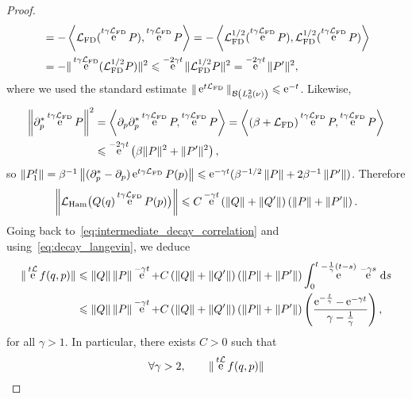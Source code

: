 \documentclass[11pt,a4paper]{article}
\DeclareMathOperator{\e}{e}
\renewcommand{\d}{\mathrm d}
\theoremstyle{plain}
\numberwithin{equation}{section}
\renewcommand{\leq}{\leqslant}
\begin{document}
\begin{proof}
\begin{align*}
        &= - \ip{\mathcal L_{\rm FD} (\e^{t \gamma \mathcal L_{\rm FD}} P)}{\e^{t \gamma \mathcal L_{\rm FD}} P}
        = - \ip{\mathcal L_{\rm FD}^{1/2} (\e^{t \gamma \mathcal L_{\rm FD}} P)}{\mathcal L_{\rm FD}^{1/2} (\e^{t \gamma \mathcal L_{\rm FD}} P)} \\
        &= - \norm*{\e^{t \gamma \mathcal L_{\rm FD}} (\mathcal L_{\rm FD}^{1/2}P)}^2 \leq \e^{-2\gamma t} \norm*{\mathcal L_{\rm FD}^{1/2} P}^2
        = \e^{-2\gamma t} \norm*{P'}^2,
    \end{align*}
    where we used the standard estimate $\norm*{\e^{t \mathcal L_{\rm FD}}}[\mathcal B \left( L^2_0(\nu) \right)] \leq \e^{- t}$.
    Likewise,
    \begin{align*}
        \norm{\partial_p^* \e^{t \gamma \mathcal L_{\rm FD}} P}^2
        &= \ip{\partial_p \partial_p^*\e^{t \gamma \mathcal L_{\rm FD}} P}{\e^{t \gamma \mathcal L_{\rm FD}} P}
        = \ip{(\beta  +\mathcal L_{\rm FD}) \e^{t \gamma \mathcal L_{\rm FD}} P}{\e^{t \gamma \mathcal L_{\rm FD}} P} \\
        &\leq \e^{-2\gamma t} \left( \beta \norm*{P}^2 + \norm*{P'}^2 \right),
    \end{align*}
    so $\norm{P^t_1} = \beta^{-1} \norm{ (\partial_p^* - \partial_p) \e^{t \gamma \mathcal L_{\rm FD}} P(p)} \leq \e^{- \gamma t} (\beta^{-1/2}\norm{P} +  2\beta^{-1}\norm{P'})$.
    Therefore
    \[
        \norm{\mathcal L_{\rm Ham} \bigl(Q(q) \e^{t \gamma \mathcal L_{\rm FD}} P(p)\bigr)}
        \leq C \e^{-\gamma t} \left( \norm*{Q} +  \norm*{Q'}\right) \left( \norm*{P} + \norm*{P'} \right).
    \]
    Going back to~\eqref{eq:intermediate_decay_correlation} and using~\eqref{eq:decay_langevin}, we deduce
    \begin{align*}
        \norm*{ \e^{t \mathcal L} f(q,p) }
        &\leq \norm{Q} \norm{P} \e^{-\gamma t}
        + C \left( \norm*{Q} +  \norm*{Q'}\right) \left( \norm*{P} + \norm*{P'} \right) \int_{0}^{t} \e^{-\frac{1}{\gamma}(t-s)}  \, \e^{-\gamma s} \, \d s \\
        &\leq \norm{Q} \norm{P} \e^{-\gamma t}
        + C \left( \norm*{Q} +  \norm*{Q'}\right) \left( \norm*{P} + \norm*{P'} \right)
        \left( \frac{\e^{- \frac{t}{\gamma}} - \e^{- \gamma t}}{\gamma - \frac{1}{\gamma}} \right),
    \end{align*}
    for all $\gamma > 1$.
    In particular, there exists $C > 0$ such that
    \begin{equation}
        \label{eq:decay_first_result}
        \forall \gamma > 2, \qquad
        \norm*{ \e^{t \mathcal L} f(q,p) }

\end{equation}
\end{proof}
\end{document}
